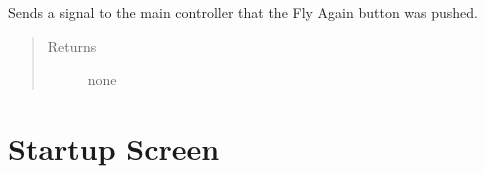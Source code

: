 \documentclass[letterpaper,10pt,english]{sphinxmanual}
\begin{document}
\begin{fulllineitems}
\begin{fulllineitems}
\begin{quote}
\begin{description}
\end{description}\end{quote}

\end{fulllineitems}


\begin{fulllineitems}
\label{\detokenize{index:src.Views.View_ReportScreen.ReportWindow.signalStartTracking}}
Sends a signal to the main controller that the Fly Again button was pushed.
\begin{quote}\begin{description}
\item[{Returns}] \leavevmode
none

\end{description}\end{quote}

\end{fulllineitems}


\end{fulllineitems}



\chapter{Startup Screen}
\label{\detokenize{index:module-src.Views.View_StartupScreen}}\label{\detokenize{index:startup-screen}}
\end{document}
